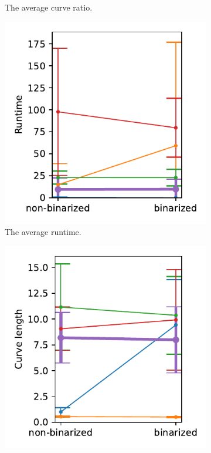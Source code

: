 \begin{figure}[h]
\begin{subfigure}{.3\textwidth}
    \caption{The average curve ratio.}
\end{subfigure}
    \begin{subfigure}{.3\textwidth}
    \centering
    \includegraphics[width=\textwidth]{graphics/eval/runtime_binarization_tonari.pdf}
    \caption{The average runtime.}
\end{subfigure}
    \begin{subfigure}{.3\textwidth}
    \centering
    \includegraphics[width=\textwidth]{graphics/eval/curve length_binarization_tonari.pdf}

\end{subfigure}
\end{figure}
